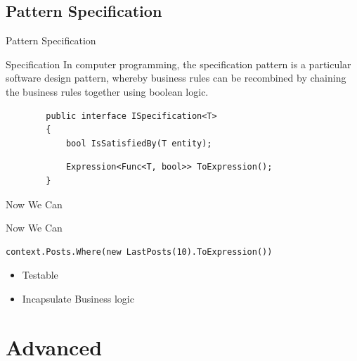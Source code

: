 \documentclass{bredelebeamer}
\begin{document}
\subsection{Pattern Specification}
\begin{frame}[fragile]{Pattern Specification}
    \begin{block}{Specification}
        In computer programming, the specification pattern is a particular software design pattern, whereby business rules can be recombined by chaining the business rules together using boolean logic. 
    \end{block}
    \pause
    \begin{lstlisting}
        public interface ISpecification<T>
        {
            bool IsSatisfiedBy(T entity);
    \end{lstlisting}
    \pause
    \begin{lstlisting}
            Expression<Func<T, bool>> ToExpression();
        }
    \end{lstlisting}
\end{frame}
\begin{frame}[fragile]{Now We Can}
    
\end{frame}

\begin{frame}[fragile]{Now We Can}
    \begin{lstlisting}
context.Posts.Where(new LastPosts(10).ToExpression())
    \end{lstlisting}
    \begin{itemize}
        \item{Testable}
        \item{Incapsulate Business logic}
    \end{itemize}
\end{frame}
\section{Advanced}
\end{document}
